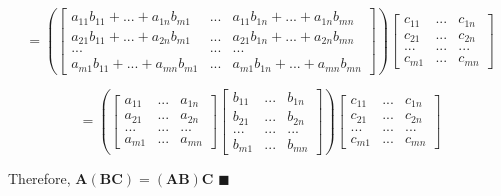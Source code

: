 \documentclass{article}
\newcommand*{\QED}{\hfill\ensuremath{\blacksquare}}
\begin{document}
\begin{enumerate}
		$$= \left(\begin{bmatrix}
		a_{11} b_{11} + ... + a_{1n} b_{m1} & ... & a_{11} b_{1n} + ... + a_{1n} b_{mn} \\
		a_{21} b_{11} + ... + a_{2n} b_{m1} & ... & a_{21} b_{1n} + ... + a_{2n} b_{mn} \\
		...       &      ...      &      ...      \\
		a_{m1} b_{11} + ... + a_{mn} b_{m1}  & ... & a_{m1} b_{1n} + ... + a_{mn} b_{mn}
		\end{bmatrix}\right) \begin{bmatrix}
		c_{11}  &  ... & c_{1n} \\
		c_{21}  &  ... & c_{2n} \\
		...     &  ... & ...    \\
		c_{m1}  &  ... & c_{mn}
		\end{bmatrix} $$
		
		$$ = \left( \begin{bmatrix}
		a_{11}  &  ... & a_{1n} \\
		a_{21}  &  ... & a_{2n} \\
		...     &  ... & ...    \\
		a_{m1}  &  ... & a_{mn} 
		\end{bmatrix} \begin{bmatrix}
		b_{11}  &  ... & b_{1n} \\
		b_{21}  &  ... & b_{2n} \\
		...     &  ... & ...    \\
		b_{m1}  &  ... & b_{mn}
		\end{bmatrix}\right) \begin{bmatrix}
		c_{11}  &  ... & c_{1n} \\
		c_{21}  &  ... & c_{2n} \\
		...     &  ... & ...    \\
		c_{m1}  &  ... & c_{mn}
		\end{bmatrix}$$
		
		Therefore, $ \textbf{A}(\textbf{BC}) = (\textbf{AB})\textbf{C} $ \QED \\
		

\end{enumerate}
\end{document}
